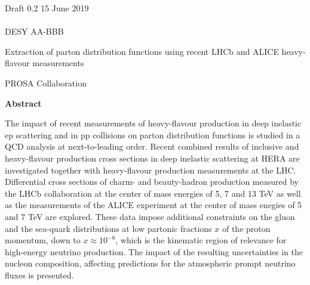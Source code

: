 \documentclass[12pt]{article}
\begin{document}
\begin{titlepage}
\noindent
Draft 0.2  \hfill 15 June 2019\\
\\
DESY AA-BBB %
\\

\vspace{1.3cm}

\begin{center}
  {\bf 

\large

Extraction of parton distribution functions using recent LHCb and ALICE heavy-flavour measurements
  }
  \vspace{1.5cm}

  {\large
    PROSA Collaboration
  }\\

  \vspace{1.2cm}

\end{center}
  \vspace{2.4cm}
\begin{center}
\large
{\bf Abstract}
\vspace{-0.2cm}
\end{center}
The impact of recent measurements of heavy-flavour production in deep inelastic ep scattering and
in pp collisions on parton distribution functions is studied in a QCD analysis at next-to-leading order. 
Recent combined results of inclusive and heavy-flavour production cross sections in deep inelastic scattering at HERA are 
investigated together with heavy-flavour production measurements at the LHC. Differential cross sections of charm- and 
beauty-hadron production measured by the LHCb collaboration at the center of mass energies of 5, 7 and 13 TeV as well 
as the measurements of the ALICE experiment at the center of mass enegies of 5 and 7 TeV are explored. 
These data impose additional constraints on the gluon and the sea-quark distributions at low partonic fractions
$x$ of the proton momentum, down to $x\approx10^{-6}$, which is the kinematic region of relevance for high-energy 
neutrino production. The impact of the resulting uncertainties in the nucleon composition, affecting predictions for 
the atmospheric prompt neutrino fluxes is presented.

\vfill
\end{titlepage}


%
%
\newpage
\end{document}
